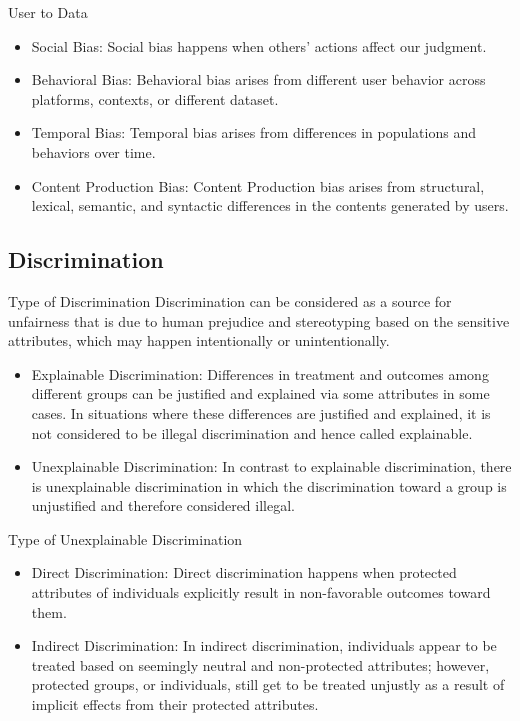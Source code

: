\documentclass[10pt, xcolor=table,aspectratio=169]{beamer}
\begin{document}
\begin{frame}{User to Data}
	\begin{itemize}
		\item Social Bias: Social bias happens when others’ actions affect our judgment.
		\item Behavioral Bias: Behavioral bias arises from different user behavior across platforms, contexts, or different dataset.
		\item Temporal Bias: Temporal bias arises from differences in populations and behaviors over time.
		\item Content Production Bias: Content Production bias arises from structural, lexical, semantic, and syntactic differences in the contents generated by users.

	\end{itemize}

\end{frame}

\subsection{Discrimination}

\begin{frame}{Type of Discrimination}
	Discrimination can be considered as	a source for unfairness that is due to human prejudice and stereotyping based on the sensitive
	attributes, which may happen intentionally or unintentionally.
	\begin{itemize}
		\item Explainable Discrimination: Differences in treatment and outcomes among different groups can be justified and explained via some attributes in some cases. In situations where these differences are justified and explained, it is not considered to be illegal discrimination and hence called explainable.
		\item Unexplainable Discrimination: In contrast to explainable discrimination, there is unexplainable discrimination in which the discrimination toward a group is unjustified and therefore considered illegal.
	\end{itemize}

\end{frame}


\begin{frame}{Type of Unexplainable Discrimination}
	\begin{itemize}
		\item Direct Discrimination: Direct discrimination happens when protected attributes of individuals explicitly result in non-favorable outcomes toward them.
		\item Indirect Discrimination: In indirect discrimination, individuals appear to be treated based on seemingly neutral and non-protected attributes; however, protected groups, or individuals, still get to be treated unjustly as a result of implicit effects from their protected attributes.
	\end{itemize}

\end{frame}
\end{document}
